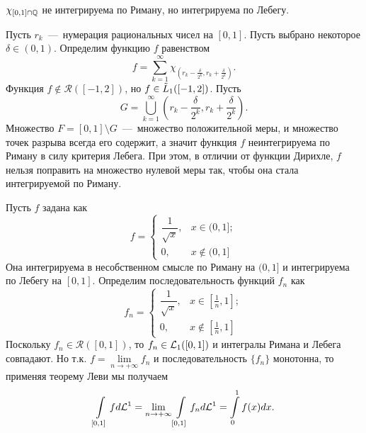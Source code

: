 \begin{example}
    $\chi_{[0, 1] \cap \mathbb{Q}}$ не интегрируема по Риману, но интегрируема по Лебегу.
\end{example}
\begin{example}[?]
    Пусть ${r_k}$~---~нумерация рациональных чисел на $[0, 1]$. Пусть выбрано некоторое $\delta \in (0, 1)$. Определим функцию $f$ равенством \[f = \sum\limits_{k = 1}^\infty \chi_{(r_k - \frac{\delta}{2^k}, r_k + \frac{\delta}{2^k})}.\]
    Функция $f \notin \mathcal{R}([-1, 2])$, но $f \in \Tilde{L}_1([-1, 2])$. Пусть \[G = \bigcup\limits_{k = 1}^\infty (r_k - \dfrac{\delta}{2^k}, r_k + \dfrac{\delta}{2^k}).\]
     Множество $F = [0, 1] \setminus G$~---~множество положительной меры, и множество точек разрыва всегда его содержит, а значит функция $f$ неинтегрируема по Риману в силу критерия Лебега. При этом, в отличии от функции Дирихле, $f$ нельзя поправить на множество нулевой меры так, чтобы она стала интегрируемой по Риману. 
\end{example}
\begin{example}
    Пусть $f$ задана как \begin{equation*}
    f = 
        \begin{cases}
        \dfrac{1}{\sqrt{x}}, & x \in (0, 1]; \\
        0, & x \notin (0, 1]
        \end{cases}
    \end{equation*}
    Она интегрируема в несобственном смысле по Риману на $(0, 1]$ и интегрируема по Лебегу на $[0, 1]$. Определим последовательность функций $f_n$ как \begin{equation*}
    f_n = 
        \begin{cases}
         \dfrac{1}{\sqrt{x}}, & x \in [\frac{1}{n}, 1]; \\ 
         0, & x \notin [\frac{1}{n}, 1]
        \end{cases}
    \end{equation*}
    Поскольку $f_n \in \mathcal{R}([0, 1])$, то $f_n \in \mathcal{L}_1([0, 1])$ и интегралы Римана и Лебега совпадают. Но т.к. $f = \lim\limits_{n \rightarrow +\infty} f_n$ и последовательность $\{f_n\}$ монотонна, то применяя теорему Леви мы получаем \[\int\limits_{[0, 1]}fd\mathcal{L}^1 = \lim\limits_{n \rightarrow +\infty} \int\limits_{[0, 1]}f_nd\mathcal{L}^1 = \int\limits_0^1 f(x)dx.\]
\end{example}


